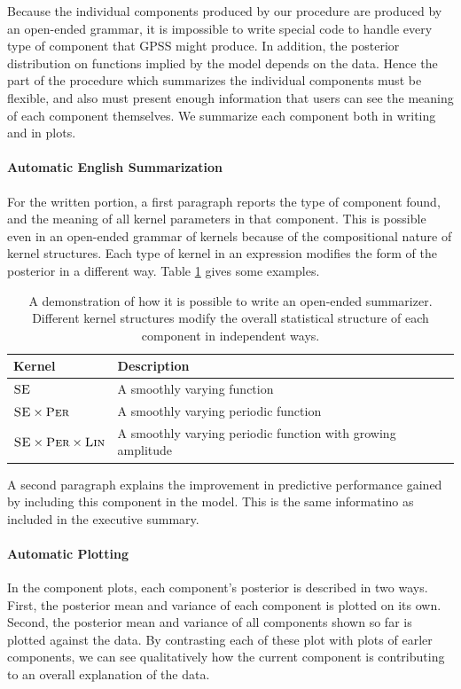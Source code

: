 \documentclass{article} %
\begin{document}
Because the individual components produced by our procedure are produced by an open-ended grammar, it is impossible to write special code to handle every type of component that GPSS might produce.  In addition, the posterior distribution on functions implied by the model depends on the data.  Hence the part of the procedure which summarizes the individual components must be flexible, and also must present enough information that users can see the meaning of each component themselves.  We summarize each component both in writing and in plots.

\paragraph{Automatic English Summarization}
For the written portion, a first paragraph reports the type of component found, and the meaning of all kernel parameters in that component.  This is possible even in an open-ended grammar of kernels because of the compositional nature of kernel structures.  Each type of kernel in an expression modifies the form of the posterior in a different way.  Table \ref{table:descriptions} gives some examples.

\begin{table}
\begin{tabular}{l|l}
Kernel & Description \\
\midrule
${\textsc{SE}}$ & A smoothly varying function \\
${\textsc{SE}} \times {\textsc{Per}}$ & A smoothly varying periodic function \\
${\textsc{SE}} \times {\textsc{Per}} \times {\textsc{Lin}}$ & A smoothly varying periodic function with growing amplitude \\
\end{tabular}
\caption{A demonstration of how it is possible to write an open-ended summarizer.  Different kernel structures modify the overall statistical structure of each component in independent ways.}
\label{table:descriptions}
\end{table}

A second paragraph explains the improvement in predictive performance gained by including this component in the model. This is the same informatino as included in the executive summary.

\paragraph{Automatic Plotting}
In the component plots, each component's posterior is described in two ways.  First, the posterior mean and variance of each component is plotted on its own.  Second, the posterior mean and variance of all components shown so far is plotted against the data.  By contrasting each of these plot with plots of earler components, we can see qualitatively how the current component is contributing to an overall explanation of the data.
\end{document}
